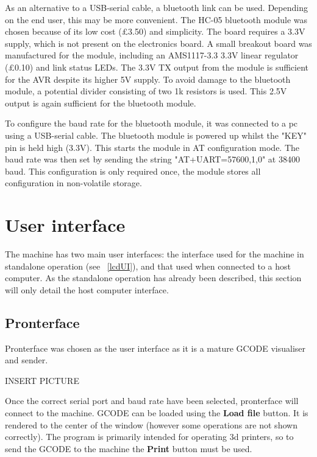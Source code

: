 
As an alternative to a USB-serial cable, a bluetooth link can be used. Depending on the end user, this may be more convenient. The HC-05 bluetooth module was
chosen because of its low cost (\pounds 3.50) and simplicity. The board requires a 3.3V supply, which is not present on the electronics board. A small
breakout board was manufactured for the module, including an AMS1117-3.3 3.3V linear regulator (\pounds 0.10) and link status LEDs. The 3.3V TX output from the module is sufficient
for the AVR despite its higher 5V supply. To avoid damage to the bluetooth module, a potential divider consisting of two 1k resistors is used. This 2.5V output is
again sufficient for the bluetooth module.

To configure the baud rate for the bluetooth module, it was connected to a pc using a USB-serial cable. The bluetooth module is powered up whilst the "KEY" pin is held high (3.3V).
This starts the module in AT configuration mode. The baud rate was then set by sending the string "AT+UART=57600,1,0" at 38400 baud. This configuration is only required once,
the module stores all configuration in non-volatile storage.

\section{User interface}
The machine has two main user interfaces: the interface used for the machine in 
standalone operation (see ~\ref{lcdUI}), and that used when connected to a host computer.
As the standalone operation has already been described, this section will only
detail the host computer interface.

\subsection{Pronterface}
Pronterface was chosen as the user interface as it is a mature GCODE visualiser
and sender.

INSERT PICTURE

Once the correct serial port and baud rate have been selected, pronterface will connect
to the machine. GCODE can be loaded using the \textbf{Load file} button. It is 
rendered to the center of the window (however some operations are not shown correctly).
The program is primarily intended for operating 3d printers, so to send the GCODE
to the machine the \textbf{Print} button must be used.

